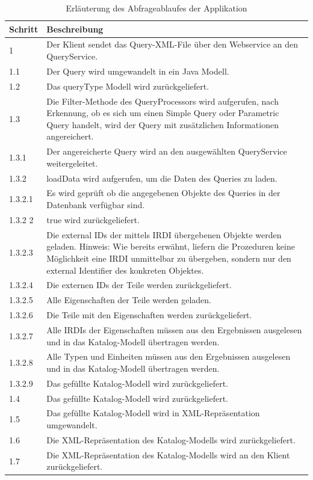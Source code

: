 \begin{table}[!hbt]\vspace{1ex}\centering\scriptsize\begin{tabular}{p{3cm}p{10cm}}
\toprule \rowcolor{mylightergray}
\textbf{Schritt} & \textbf{Beschreibung}\\
\midrule
1 &  Der Klient sendet das Query-XML-File über den Webservice an den QueryService. \\
\hline
1.1 &  Der Query wird umgewandelt in ein Java Modell. \\
\hline
1.2 &  Das queryType Modell wird zurückgeliefert. \\
\hline
1.3 &  Die Filter-Methode des QueryProcessors wird aufgerufen, nach Erkennung, ob es sich um einen Simple Query oder Parametric Query handelt, wird der Query mit zusätzlichen Informationen angereichert. \\
\hline
1.3.1 &  Der angereicherte Query wird an den ausgewählten QueryService weitergeleitet.  \\
\hline
1.3.2 &  loadData wird aufgerufen, um die Daten des Queries zu laden. \\
\hline
1.3.2.1 &  Es wird geprüft ob die angegebenen Objekte des Queries in der Datenbank verfügbar sind. \\
\hline
1.3.2 2 &  true wird zurückgeliefert. \\
\hline
1.3.2.3 &  Die external IDs der mittels IRDI übergebenen Objekte werden geladen. Hinweis: Wie bereits erwähnt, liefern die Prozeduren keine Möglichkeit eine IRDI unmittelbar zu übergeben, sondern nur den external Identifier des konkreten Objektes. \\
\hline
1.3.2.4 &  Die externen IDs der Teile werden zurückgeliefert. \\
\hline
1.3.2.5 &  Alle Eigenschaften der Teile werden geladen.  \\
\hline
1.3.2.6 &  Die Teile mit den Eigenschaften werden zurückgeliefert. \\
\hline
1.3.2.7 &  Alle IRDIs der Eigenschaften müssen aus den Ergebnissen ausgelesen und in das Katalog-Modell übertragen werden. \\
\hline
1.3.2.8 &  Alle Typen und Einheiten müssen aus den Ergebnissen ausgelesen und in das Katalog-Modell übertragen werden. \\
\hline
1.3.2.9 &  Das gefüllte Katalog-Modell wird zurückgeliefert. \\
\hline
1.4 &  Das gefüllte Katalog-Modell wird zurückgeliefert. \\
\hline
1.5 &  Das gefüllte Katalog-Modell wird in XML-Repräsentation umgewandelt. \\
\hline
1.6 &  Die XML-Repräsentation des Katalog-Modells wird zurückgeliefert. \\
\hline
1.7 &  Die XML-Repräsentation des Katalog-Modells wird an den Klient zurückgeliefert. \\
\bottomrule
\end{tabular}
\caption{\label{tab.abfrageablauf}Erläuterung des Abfrageablaufes der Applikation}
\vspace{2ex}\end{table}

